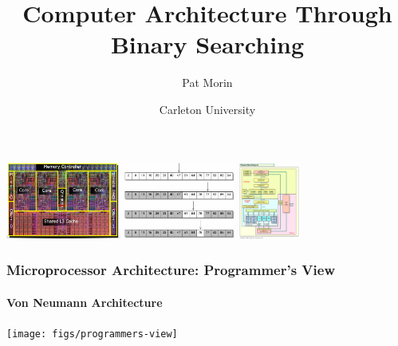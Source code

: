 \documentclass[xcolor=dvipsnames]{beamer}
\title{Computer Architecture Through Binary Searching}
\author{Pat Morin}
\date{Carleton University}
\begin{document}
\begin{frame}
  \titlepage
  \centerline{
    \includegraphics[height=1in]{images/nehalemdie}
    \includegraphics[height=1in]{images/binary-search}
    \includegraphics[height=1in]{images/nehalem-block}
  }
\end{frame}

\begin{frame}
  \frametitle{Microprocessor Architecture: Programmer's View}
  \framesubtitle{Von Neumann Architecture}

  \begin{center}
    \texttt{[image: figs/programmers-view]} 
  \end{center}
  
  
\end{frame}
\end{document}
